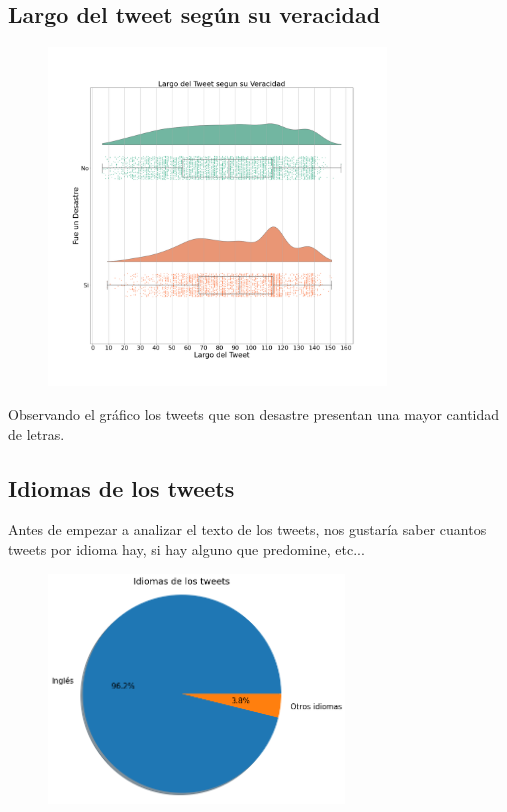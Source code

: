 \documentclass[titlepage,a4paper]{article}
\begin{document}
\subsection{\Large Largo del tweet según su veracidad}
{\Large
\begin{figure}[H]
 \centering
 \includegraphics[width=0.8\textwidth, height=0.8\textheight, keepaspectratio]{graficos/largo_tweet_veracidad_0.png}
\end{figure}
Observando el gráfico los tweets que son desastre presentan una mayor cantidad de letras.
\par}
\subsection{\Large Idiomas de los tweets}
{\Large 
Antes de empezar a analizar el texto de los tweets, nos gustaría saber cuantos tweets por idioma hay, si hay alguno que predomine, etc...
\par}
{\Large
\begin{figure}[H]
 \centering
 \includegraphics[width=0.7\textwidth, height=0.7\textheight, keepaspectratio]{graficos/idiomasdelostweets.png}
\end{figure}
{\Large 
\par}
\par}
\end{document}

